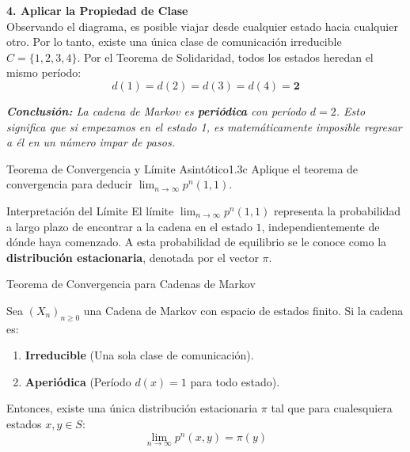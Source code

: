\documentclass[10pt,a4paper]{article}
\begin{document}
\begin{tcolorbox}[enhanced, colback=white, colframe=gray!50!black, arc=2mm, 
                  title=\textbf{Ejemplo Aplicado para comprensión},
                  fonttitle=\bfseries, coltitle=white, drop shadow]
\textbf{4. Aplicar la Propiedad de Clase} \\
Observando el diagrama, es posible viajar desde cualquier estado hacia cualquier otro. Por lo tanto, existe una única clase de comunicación irreducible $C = \{1, 2, 3, 4\}$.
Por el Teorema de Solidaridad, todos los estados heredan el mismo período:
\[ d(1) = d(2) = d(3) = d(4) = \mathbf{2} \]

\textit{\textbf{Conclusión:} La cadena de Markov es \textbf{periódica} con período $d=2$. Esto significa que si empezamos en el estado 1, es matemáticamente imposible regresar a él en un número impar de pasos.}

\end{tcolorbox}

\newpage

\vspace{5mm}

\begin{ejercicio}{Teorema de Convergencia y Límite Asintótico}{1.3c}
    Aplique el teorema de convergencia para deducir $\lim_{n \to \infty} p^n(1, 1)$.
\end{ejercicio}

\vspace{3mm}

\begin{nota}{Interpretación del Límite}
    El límite $\lim_{n \to \infty} p^n(1, 1)$ representa la probabilidad a largo plazo de encontrar a la cadena en el estado $1$, independientemente de dónde haya comenzado. A esta probabilidad de equilibrio se le conoce como la \textbf{distribución estacionaria}, denotada por el vector $\pi$.
\end{nota}

\vspace{3mm}

\begin{mytheo}{Teorema de Convergencia para Cadenas de Markov}{}

    \vspace{3mm}

    Sea $(X_n)_{n \ge 0}$ una Cadena de Markov con espacio de estados finito. Si la cadena es:
    \begin{enumerate}
        \item \textbf{Irreducible} (Una sola clase de comunicación).
        \item \textbf{Aperiódica} (Período $d(x) = 1$ para todo estado).
    \end{enumerate}
    Entonces, existe una única distribución estacionaria $\pi$ tal que para cualesquiera estados $x, y \in S$:
    \[ \lim_{n \to \infty} p^n(x, y) = \pi(y) \]
\end{mytheo}
\end{document}
